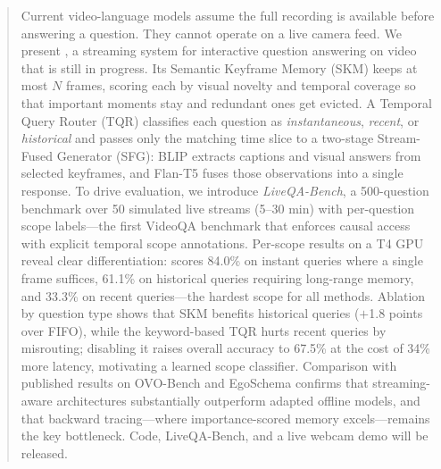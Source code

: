 \begin{abstract}
Current video-language models assume the full recording is available before answering a question. They cannot operate on a live camera feed.
We present \ours, a streaming system for interactive question answering on video that is still in progress.
Its Semantic Keyframe Memory (SKM) keeps at most $N$ frames, scoring each by visual novelty and temporal coverage so that important moments stay and redundant ones get evicted.
A Temporal Query Router (TQR) classifies each question as \emph{instantaneous}, \emph{recent}, or \emph{historical} and passes only the matching time slice to a two-stage Stream-Fused Generator (SFG): BLIP extracts captions and visual answers from selected keyframes, and Flan-T5 fuses those observations into a single response.
To drive evaluation, we introduce \emph{LiveQA-Bench}, a 500-question benchmark over 50 simulated live streams (5--30 min) with per-question scope labels---the first VideoQA benchmark that enforces causal access with explicit temporal scope annotations.
Per-scope results on a T4 GPU reveal clear differentiation: \ours scores 84.0\% on instant queries where a single frame suffices, 61.1\% on historical queries requiring long-range memory, and 33.3\% on recent queries---the hardest scope for all methods.
Ablation by question type shows that SKM benefits historical queries ($+$1.8 points over FIFO), while the keyword-based TQR hurts recent queries by misrouting; disabling it raises overall accuracy to 67.5\% at the cost of 34\% more latency, motivating a learned scope classifier.
Comparison with published results on OVO-Bench and EgoSchema confirms that streaming-aware architectures substantially outperform adapted offline models, and that backward tracing---where importance-scored memory excels---remains the key bottleneck.
Code, LiveQA-Bench, and a live webcam demo will be released.
\end{abstract}
